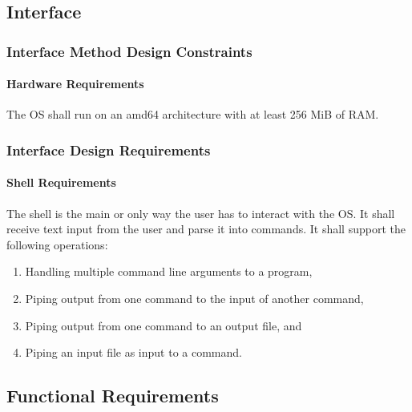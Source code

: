 \subsection{Interface}

\subsubsection{Interface Method Design Constraints}
\paragraph{Hardware Requirements} The OS shall run on an amd64 architecture with at least 256 MiB of RAM.

\subsubsection{Interface Design Requirements}
	\paragraph{Shell Requirements}
	The shell is the main or only way the user has to interact with the OS. It shall receive text input from the user and parse it into commands. It shall support the following operations:
  \begin{enumerate}
    \item Handling multiple command line arguments to a program,
    \item Piping output from one command to the input of another command,
    \item Piping output from one command to an output file, and
		\item Piping an input file as input to a command.
  \end{enumerate}
	





\subsection{Functional Requirements}

